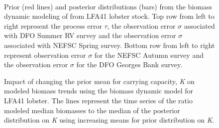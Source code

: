 \documentclass[11pt]{article}
\newcommand{\D}{.}
\newcommand{\spm}{/backup/bio_data/bio.lobster/spmodelling/lfa41/}
\begin{document}
\begin{landscape}
\begin{figure}
\centering
       \\
         \caption{Prior (red lines) and posterior distributions (bars) from the biomass dynamic modeling of from LFA41 lobster stock. Top row from left to right represent the process error $\tau$, the observation error $\sigma$ associated with DFO Summer RV survey and the observation error $\sigma$ associated with NEFSC Spring survey. Bottom row from left to right represent observation error $\sigma$ for the NEFSC Autumn survey and the observation error $\sigma$ for the DFO Georges Bank survey. }
       
        
\end{figure}

%

\end{landscape}
     \clearpage

\begin{figure}
\centering
{}
\caption{Impact of changing the prior mean for carrying capacity, \emph{K} on modeled biomass trends using the biomass dynamic model for LFA41 lobster. The lines represent the time series of the ratio modeled median biomasses to the median of the posterior distribution on \emph{K} using increasing means for prior distribution on \emph{K}. }

\end{figure}
     \clearpage
\end{document}
